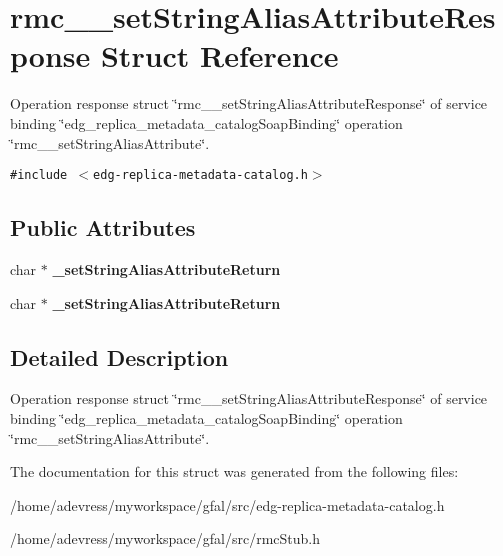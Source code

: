 \section{rmc\_\-\_\-set\-String\-Alias\-Attribute\-Response Struct Reference}
\label{structrmc____setStringAliasAttributeResponse}
Operation response struct \char`\"{}rmc\_\-\_\-set\-String\-Alias\-Attribute\-Response\char`\"{} of service binding \char`\"{}edg\_\-replica\_\-metadata\_\-catalog\-Soap\-Binding\char`\"{} operation \char`\"{}rmc\_\-\_\-set\-String\-Alias\-Attribute\char`\"{}.  


{\tt \#include $<$edg-replica-metadata-catalog.h$>$}

\subsection*{Public Attributes}
\begin{CompactItemize}
\item 
char $\ast$ \textbf{\_\-set\-String\-Alias\-Attribute\-Return}\label{structrmc____setStringAliasAttributeResponse_c6acc1b54941a4537289a14d2a515c56}

\item 
char $\ast$ \textbf{\_\-set\-String\-Alias\-Attribute\-Return}\label{structrmc____setStringAliasAttributeResponse_c6acc1b54941a4537289a14d2a515c56}

\end{CompactItemize}


\subsection{Detailed Description}
Operation response struct \char`\"{}rmc\_\-\_\-set\-String\-Alias\-Attribute\-Response\char`\"{} of service binding \char`\"{}edg\_\-replica\_\-metadata\_\-catalog\-Soap\-Binding\char`\"{} operation \char`\"{}rmc\_\-\_\-set\-String\-Alias\-Attribute\char`\"{}. 



The documentation for this struct was generated from the following files:\begin{CompactItemize}
\item 
/home/adevress/myworkspace/gfal/src/edg-replica-metadata-catalog.h\item 
/home/adevress/myworkspace/gfal/src/rmc\-Stub.h\end{CompactItemize}
